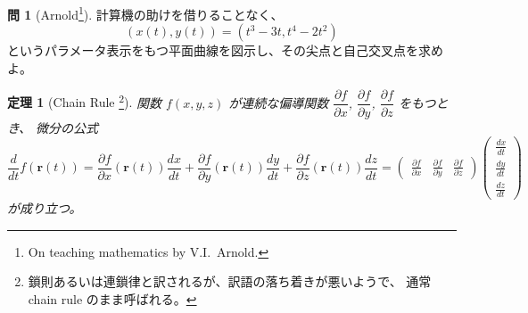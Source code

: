 \documentclass[a4paper]{jsarticle}
\newtheorem{Theorem}{定理}[section]
\theoremstyle{definition}
\newtheorem{Exercise}{問}%
\theoremstyle{remark}
\newcommand{\del}{\partial}
\begin{document}
\begin{Exercise}[Arnold\footnote{On teaching mathematics by V.I.~Arnold.}]
計算機の助けを借りることなく、
 \[
(x(t),y(t)) = (t^3 -3t,t^4 - 2t^2) 
\]
というパラメータ表示をもつ平面曲線を図示し、その尖点と自己交叉点を求めよ。
\end{Exercise}

\begin{Theorem}[Chain Rule
\footnote{鎖則あるいは連鎖律と訳されるが、訳語の落ち着きが悪いようで、
通常 chain rule のまま呼ばれる。}]
関数 $f(x,y,z)$ が連続な偏導関数 $\dfrac{\del f}{\del x}$, 
$\dfrac{\del f}{\del y}$, $\dfrac{\del f}{\del z}$ をもつとき、
微分の公式
\[
\dfrac{d}{dt} f(\bm{r}(t)) = 
\dfrac{\del f}{\del x}(\bm{r}(t))\dfrac{dx}{dt}
+ \dfrac{\del f}{\del y}(\bm{r}(t))\dfrac{dy}{dt}
+ \dfrac{\del f}{\del z}(\bm{r}(t))\dfrac{dz}{dt}
= 
\begin{pmatrix}
\frac{\partial f}{\partial x}& 
\frac{\partial f}{\partial y}&
\frac{\partial f}{\partial z}
\end{pmatrix}
\begin{pmatrix}
\frac{dx}{dt}\\
\frac{dy}{dt}\\
\frac{dz}{dt}
\end{pmatrix}
\]
が成り立つ。
\end{Theorem}
\par
\medskip
\end{document}

